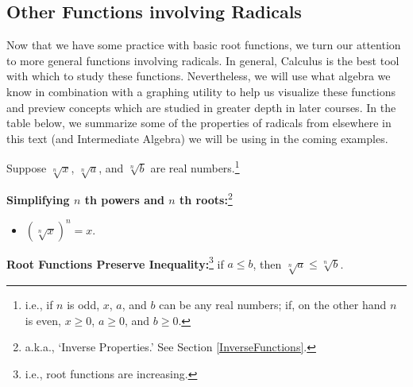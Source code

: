 \subsection{Other Functions involving Radicals}
\label{OtherFunctionsinvolvingRadicals}

Now that we have some practice with basic root functions, we turn our attention to more general functions involving radicals.  In general, Calculus is the best tool with which to study these functions.  Nevertheless,  we will use what algebra we know in combination with a graphing utility to help us visualize these functions and preview concepts which are studied in greater depth in later courses. In the table below, we summarize some of the properties of radicals from elsewhere in this text (and Intermediate Algebra) we will be using in the coming examples.  

\colorbox{ResultColor}{\bbm

\begin{thm} \label{basicradicalpropseqineq}  Suppose $\sqrt[n]{x}$, $\sqrt[n]{a}$, and $\sqrt[n]{b}$ are real numbers.\footnote{i.e., if $n$ is odd, $x$, $a$, and $b$ can be any real numbers;  if, on the other hand $n$ is even, $x \geq 0$, $a \geq 0$, and $b \geq 0$.}


\textbf{Simplifying $n$ th powers and $n$ th roots:}\footnote{a.k.a., `Inverse Properties.'  See Section \ref{InverseFunctions}.}

\begin{itemize}

\item  $\left( \sqrt[n]{x}\right)^n = x$.


\end{itemize}

\textbf{Root Functions Preserve Inequality:}\footnote{i.e., root functions are increasing.}  if $a \leq b$, then $\sqrt[n]{a} \leq \sqrt[n]{b}$.

\end{thm}
\ebm}


